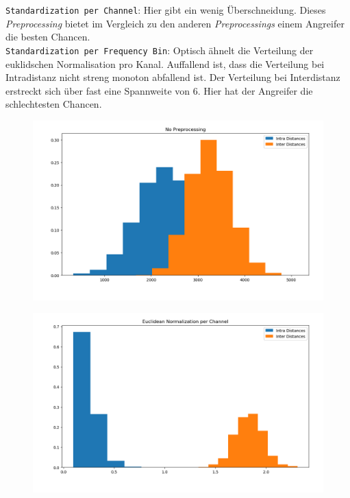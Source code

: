 \verb|Standardization per Channel|: Hier gibt ein wenig
Überschneidung. Dieses \textit{Preprocessing} bietet
im Vergleich zu den anderen \textit{Preprocessings}
einem Angreifer die besten Chancen.\\


\verb|Standardization per Frequency Bin|: Optisch ähnelt die 
Verteilung der euklidschen Normalisation pro Kanal.
Auffallend ist, dass die Verteilung bei Intradistanz nicht
streng monoton abfallend ist. Der Verteilung bei Interdistanz
erstreckt sich über fast eine Spannweite von 6. Hier hat 
der Angreifer die schlechtesten Chancen.

\begin{figure}[hbt!]
	\centering
		\includegraphics[width=1\textwidth]
		{Bilder/no_preprocessing.png}
		\label{fig:Label1.4.1}
\end{figure}



\begin{figure}[hbt!]
	\centering
		\includegraphics[width=1\textwidth]
		{Bilder/euclid_norm_channel.png}
		\label{fig:Label1.4.2}
\end{figure}



